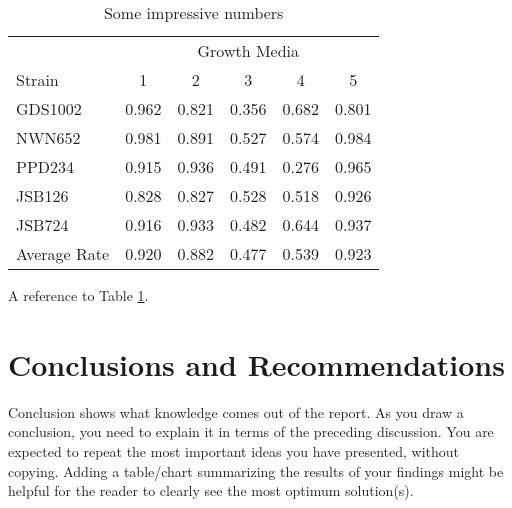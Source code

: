 \documentclass[peerreview]{IEEEtran}
\begin{document}
\begin{table} %
\centering %
\begin{tabular}{l c c c c c} %
\toprule %
& \multicolumn{5}{c}{Growth Media} \\ %
\cmidrule(l){2-6} %
Strain & 1 & 2 & 3 & 4 & 5\\ %
\midrule %
GDS1002 & 0.962 & 0.821 & 0.356 & 0.682 & 0.801\\ %
NWN652 & 0.981 & 0.891 & 0.527 & 0.574 & 0.984\\ %
PPD234 & 0.915 & 0.936 & 0.491 & 0.276 & 0.965\\ %
JSB126 & 0.828 & 0.827 & 0.528 & 0.518 & 0.926\\ %
JSB724 & 0.916 & 0.933 & 0.482 & 0.644 & 0.937\\ %
\midrule %
\midrule %
Average Rate & 0.920 & 0.882 & 0.477 & 0.539 & 0.923\\ %
\bottomrule %
\end{tabular}
\smallskip 
\caption{Some impressive numbers} %
\label{tab:template} %
\end{table}
A reference to Table \ref{tab:template}.

\section{Conclusions and Recommendations}
Conclusion shows what knowledge comes out of the report. As you draw a conclusion, you need to explain it in terms of the preceding discussion. You are expected to repeat the most important ideas you have presented, without copying. Adding a table/chart summarizing the results of your findings might be helpful for the reader to clearly see the most optimum solution(s). 
\end{document}
